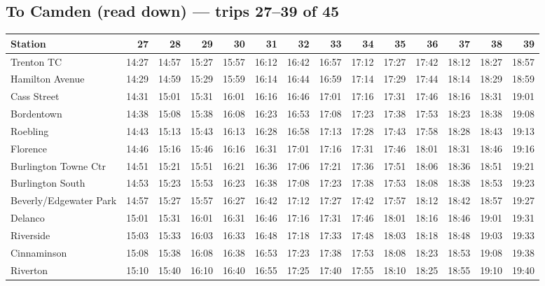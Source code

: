 \subsection*{To Camden (read down) --- trips 27--39 of 45}
\begin{center}\footnotesize\setlength{\tabcolsep}{3pt}\begin{tabular}{@{}lrrrrrrrrrrrrr@{}}\toprule
Station & 27 & 28 & 29 & 30 & 31 & 32 & 33 & 34 & 35 & 36 & 37 & 38 & 39 \\\midrule
Trenton TC & 14:27 & 14:57 & 15:27 & 15:57 & 16:12 & 16:42 & 16:57 & 17:12 & 17:27 & 17:42 & 18:12 & 18:27 & 18:57 \\
Hamilton Avenue & 14:29 & 14:59 & 15:29 & 15:59 & 16:14 & 16:44 & 16:59 & 17:14 & 17:29 & 17:44 & 18:14 & 18:29 & 18:59 \\
Cass Street & 14:31 & 15:01 & 15:31 & 16:01 & 16:16 & 16:46 & 17:01 & 17:16 & 17:31 & 17:46 & 18:16 & 18:31 & 19:01 \\
Bordentown & 14:38 & 15:08 & 15:38 & 16:08 & 16:23 & 16:53 & 17:08 & 17:23 & 17:38 & 17:53 & 18:23 & 18:38 & 19:08 \\
Roebling & 14:43 & 15:13 & 15:43 & 16:13 & 16:28 & 16:58 & 17:13 & 17:28 & 17:43 & 17:58 & 18:28 & 18:43 & 19:13 \\
Florence & 14:46 & 15:16 & 15:46 & 16:16 & 16:31 & 17:01 & 17:16 & 17:31 & 17:46 & 18:01 & 18:31 & 18:46 & 19:16 \\
Burlington Towne Ctr & 14:51 & 15:21 & 15:51 & 16:21 & 16:36 & 17:06 & 17:21 & 17:36 & 17:51 & 18:06 & 18:36 & 18:51 & 19:21 \\
Burlington South & 14:53 & 15:23 & 15:53 & 16:23 & 16:38 & 17:08 & 17:23 & 17:38 & 17:53 & 18:08 & 18:38 & 18:53 & 19:23 \\
Beverly/Edgewater Park & 14:57 & 15:27 & 15:57 & 16:27 & 16:42 & 17:12 & 17:27 & 17:42 & 17:57 & 18:12 & 18:42 & 18:57 & 19:27 \\
Delanco & 15:01 & 15:31 & 16:01 & 16:31 & 16:46 & 17:16 & 17:31 & 17:46 & 18:01 & 18:16 & 18:46 & 19:01 & 19:31 \\
Riverside & 15:03 & 15:33 & 16:03 & 16:33 & 16:48 & 17:18 & 17:33 & 17:48 & 18:03 & 18:18 & 18:48 & 19:03 & 19:33 \\
Cinnaminson & 15:08 & 15:38 & 16:08 & 16:38 & 16:53 & 17:23 & 17:38 & 17:53 & 18:08 & 18:23 & 18:53 & 19:08 & 19:38 \\
Riverton & 15:10 & 15:40 & 16:10 & 16:40 & 16:55 & 17:25 & 17:40 & 17:55 & 18:10 & 18:25 & 18:55 & 19:10 & 19:40 \\

\end{tabular}
\end{center}
